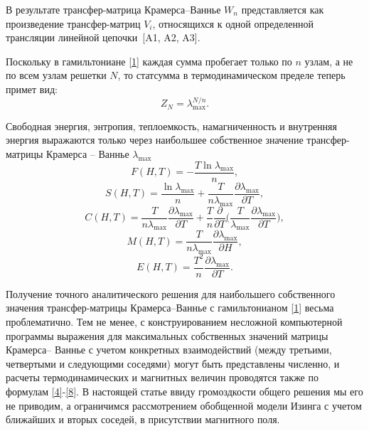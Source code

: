 В результате трансфер-матрица Крамерса--Ваннье $W_n$ представляется как произведение трансфер-матриц $V_i$, относящихся к одной определенной трансляции линейной цепочки~[A1, A2, A3].

Поскольку в гамильтониане \eqref{1} каждая сумма пробегает только по $n$ узлам, а не по всем узлам решетки $N$, то статсумма в термодинамическом пределе теперь примет вид:
\begin{equation}
Z_N=\lambda_{\text{max}}^{N/n}.
\label{3}
\end{equation}

Свободная энергия, энтропия, теплоемкость, намагниченность и внутренняя энергия выражаются только через наибольшее собственное значение трансфер-матрицы Крамерса -- Ваннье $\lambda_{\text{max}}$
\begin{equation}
F(H,T)=-\frac{T \ln \lambda_{\text{max}}}{n},
\label{4}
\end{equation}
\begin{equation}
S(H,T)=\frac{\ln \lambda_{\text{max}}}{n}+\frac{T}{n\lambda_{\text{max}}}\frac{\partial \lambda_{\text{max}}}{\partial T},
\label{5}
\end{equation}
\begin{equation}
C(H,T)=\frac{T}{n\lambda_{\text{max}}}\frac{\partial \lambda_{\text{max}}}{\partial T} + \frac{T}{n}\frac{\partial }{\partial T}\bigg(\frac{T}{\lambda_{\text{max}}}\frac{\partial \lambda_{\text{max}}}{\partial T}\bigg),
\label{6}
\end{equation}
\begin{equation}
M(H,T)=\frac{T}{n\lambda_{\text{max}}}\frac{\partial \lambda_{\text{max}}}{\partial H},
\label{7}
\end{equation}
\begin{equation}
E(H,T)=\frac{T^2}{n}\frac{\partial \lambda_{\text{max}}}{\partial T}.
\label{8}
\end{equation}

Получение точного аналитического решения для наибольшего собственного значения трансфер-матрицы Крамерса--Ваннье с гамильтонианом \eqref{1} весьма проблематично. Тем не менее, с конструированием несложной компьютерной программы выражения для максимальных собственных значений матрицы Крамерса-- Ваннье с учетом конкретных взаимодействий (между третьими, четвертыми и следующими соседями) могут быть представлены численно, и расчеты термодинамических и магнитных величин проводятся также по формулам \eqref{4}-\eqref{8}. В настоящей статье ввиду громоздкости общего решения мы его не приводим, а ограничимся рассмотрением обобщенной модели Изинга с учетом ближайших и вторых соседей, в присутствии магнитного поля.

